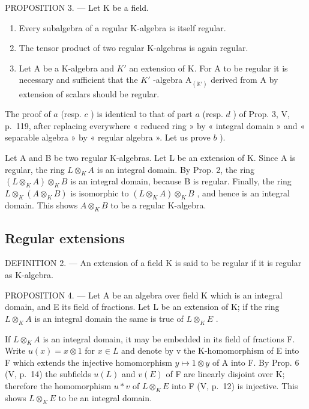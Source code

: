 PROPOSITION 3. --- Let K be a field.

\begin{enumerate}
\def\labelenumi{\alph{enumi})}
\item
  Every subalgebra of a regular K-algebra is itself regular.
\item
  The tensor product of two regular K-algebras is again regular.
\item
  Let A be a K-algebra and \(K'\) an extension of K. For A to be regular it is necessary and sufficient that the \(K'\) -algebra \(\mathrm{A}_{(\mathbb{K}')}\) derived from A by extension of scalars should be regular.
\end{enumerate}

The proof of \(a\) (resp. \(c\) ) is identical to that of part \(a\) (resp. \(d\) ) of Prop. 3, V, p.~119, after replacing everywhere « reduced ring » by « integral domain » and « separable algebra » by « regular algebra ». Let us prove \(b\) ).

Let A and B be two regular K-algebras. Let L be an extension of K. Since A is regular, the ring \(L \otimes_{K} A\) is an integral domain. By Prop. 2, the ring \((L \otimes_{K} A) \otimes_{K} B\) is an integral domain, because B is regular. Finally, the ring \(L \otimes_{K} (A \otimes_{K} B)\) is isomorphic to \((L \otimes_{K} A) \otimes_{K} B\) , and hence is an integral domain. This shows \(A \otimes_{K} B\) to be a regular K-algebra.

\subsection{Regular extensions}

DEFINITION 2. --- An extension of a field K is said to be regular if it is regular as K-algebra.

PROPOSITION 4. --- Let A be an algebra over field K which is an integral domain, and E its field of fractions. Let L be an extension of K; if the ring \(L \otimes_{K} A\) is an integral domain the same is true of \(L \otimes_{K} E\) .

If \(L \otimes_{K} A\) is an integral domain, it may be embedded in its field of fractions F. Write \(u(x) = x \otimes 1\) for \(x \in L\) and denote by v the K-homomorphism of E into F which extends the injective homomorphism \(y \mapsto 1 \otimes y\) of A into F. By Prop. 6 (V, p.~14) the subfields \(u(L)\) and \(v(E)\) of F are linearly disjoint over K; therefore the homomorphism \(u * v\) of \(L \otimes_{K} E\) into F (V, p.~12) is injective. This shows \(L \otimes_{K} E\) to be an integral domain.

